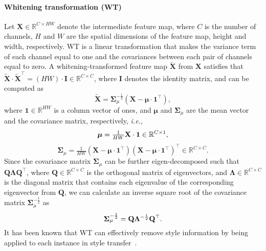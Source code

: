 \documentclass[final]{latex/cvpr}
\begin{document}
\paragraph{Whitening transformation (WT)} Let $\mathbf{X}\in\mathbb{R}^{C\times HW}$ denote the intermediate feature map, where $C$ is the number of channels, $H$ and $W$ are the spatial dimensions of the feature map, height and width, respectively.\vspace{0.02cm}
WT is a linear transformation that makes the variance term of each channel equal to one and the covariances between each pair of channels equal to zero.
A whitening-transformed feature map\vspace{0.05cm}
$\mathbf{\tilde{X}}$ from $\mathbf{X}$ satisfies that $\mathbf{\tilde{X}}\cdot\mathbf{\tilde{X}}^\top=(HW)\cdot\mathbf{I}\in\mathbb{R}^{C\times C}$, where $\mathbf{I}$ denotes the identity matrix, and can be computed as
\begin{equation} \label{eq_whitening_transform}
\mathbf{\tilde{X}}=\mathbf{\Sigma}_{\mu}^{-\frac{1}{2}}\left(\mathbf{X}-\boldsymbol{\mu}\cdot{\mathbf{1}^\top}\right),
\end{equation}
where $\mathbf{1}\in\mathbb{R}^{HW}$ is a column vector of ones, and $\boldsymbol{\mu}$ and $\mathbf{\Sigma}_{\mu}$ are the mean vector and the covariance matrix, respectively, \textit{i.e.,} 
\vspace{-0.1cm}
\begin{equation}\label{eq_mean}
\vspace{-0.05cm}
\boldsymbol{\mu}=\tfrac{1}{HW}\mathbf{X}\cdot{\mathbf{1}}\in \mathbb{R}^{C\times{1}},
\end{equation}
\begin{equation}\label{eq_covariance}
\mathbf{\Sigma}_{\mu}=\tfrac{1}{HW}\left(\mathbf{X}-\boldsymbol{\mu}\cdot{\mathbf{1}^\top}\right)\left(\mathbf{X}-\boldsymbol{\mu}\cdot{\mathbf{1}^\top}\right)^\top\in\mathbb{R}^{C\times{C}}.
\end{equation}
Since the covariance matrix $\mathbf{\Sigma}_{\mu}$ can be further eigen-decomposed such that $\mathbf{Q}\mathbf{\Lambda}\mathbf{Q}^\top$, where $\mathbf{Q}\in\mathbb{R}^{C\times{C}}$ is the orthogonal matrix of eigenvectors, and $\mathbf{\Lambda}\in\mathbb{R}^{C\times{C}}$ is the diagonal matrix that contains each eigenvalue of the corresponding eigenvector from $\mathbf{Q}$, we can calculate an inverse square root of the covariance matrix $\mathbf{\Sigma}_{\mu}^{-\frac{1}{2}}$ as
\vspace{-0.05cm}
\begin{equation}\label{eq_inverse_square_root}
\mathbf{\Sigma}_{\mu}^{-\frac{1}{2}}=\mathbf{Q}\mathbf{\Lambda}^{-\frac{1}{2}}\mathbf{Q}^\top.
\vspace{-0.05cm}
\end{equation}
It has been known that WT can effectively remove style information by being applied to each instance in style transfer~\cite{li2017universal}.
\end{document}
